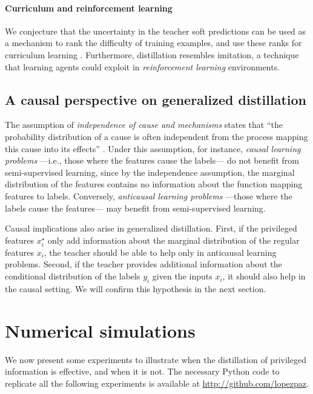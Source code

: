\documentclass{article}
\begin{document}
\paragraph{Curriculum and reinforcement learning} We conjecture that the
uncertainty in the teacher soft predictions can be used as a mechanism to rank
the difficulty of training examples, and use these ranks for curriculum
learning \citep{bengio2009curriculum}. Furthermore, distillation 
resembles imitation, a technique that learning agents could exploit in
\emph{reinforcement learning} environments.

\subsection{A causal perspective on generalized distillation}\label{sec:causal}

The assumption of \emph{independence of cause and mechanisms} states that ``the
probability distribution of a cause is often independent from the process
mapping this cause into its effects'' \citep{Scholkopf12}.  Under this
assumption, for instance, \emph{causal learning problems} ---i.e., those where
the features cause the labels--- do not benefit from semi-supervised learning,
since by the independence assumption, the marginal distribution of the features
contains no information about the function mapping features to labels.
Conversely, \emph{anticausal learning problems} ---those where the labels cause
the features--- may benefit from semi-supervised learning. 

Causal implications also arise in generalized distillation.  First, if the
privileged features $x^\star_i$ only add information about the marginal
distribution of the regular features $x_i$, the teacher should be able to help
only in anticausal learning problems. Second, if the teacher provides
additional information about the conditional distribution of the labels $y_i$
given the inputs $x_i$, it should also help in the causal setting. We will confirm this hypothesis in the next section.

\section{Numerical simulations}
We now present some experiments to illustrate when the
distillation of privileged information is effective, and when it is not.  The
necessary Python code to replicate all the following experiments is available
at \url{http://github.com/lopezpaz}.
\end{document}
